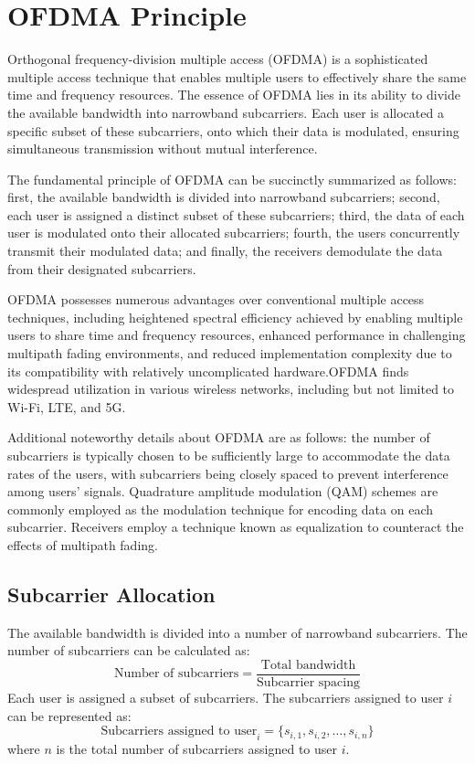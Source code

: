 \documentclass[conference]{IEEEtran}
\begin{document}
\section{OFDMA Principle}
Orthogonal frequency-division multiple access (OFDMA) is a sophisticated multiple access technique that enables multiple users to effectively share the same time and frequency resources. The essence of OFDMA lies in its ability to divide the available bandwidth into narrowband subcarriers. Each user is allocated a specific subset of these subcarriers, onto which their data is modulated, ensuring simultaneous transmission without mutual interference.

The fundamental principle of OFDMA can be succinctly summarized as follows: first, the available bandwidth is divided into narrowband subcarriers; second, each user is assigned a distinct subset of these subcarriers; third, the data of each user is modulated onto their allocated subcarriers; fourth, the users concurrently transmit their modulated data; and finally, the receivers demodulate the data from their designated subcarriers.

OFDMA possesses numerous advantages over conventional multiple access techniques, including heightened spectral efficiency achieved by enabling multiple users to share time and frequency resources, enhanced performance in challenging multipath fading environments, and reduced implementation complexity due to its compatibility with relatively uncomplicated hardware.OFDMA finds widespread utilization in various wireless networks, including but not limited to Wi-Fi, LTE, and 5G.

Additional noteworthy details about OFDMA are as follows: the number of subcarriers is typically chosen to be sufficiently large to accommodate the data rates of the users, with subcarriers being closely spaced to prevent interference among users' signals. Quadrature amplitude modulation (QAM) schemes are commonly employed as the modulation technique for encoding data on each subcarrier. Receivers employ a technique known as equalization to counteract the effects of multipath fading.

\subsection{Subcarrier Allocation}

The available bandwidth is divided into a number of narrowband subcarriers. The number of subcarriers can be calculated as:
$$
\text{{Number of subcarriers}} = \frac{{\text{{Total bandwidth}}}}{{\text{{Subcarrier spacing}}}}
$$
Each user is assigned a subset of subcarriers. The subcarriers assigned to user \(i\) can be represented as:
$$
\text{{Subcarriers assigned to user}}_i = \{s_{i,1}, s_{i,2}, \ldots, s_{i,n}\}
$$
where \(n\) is the total number of subcarriers assigned to user \(i\).
\end{document}
